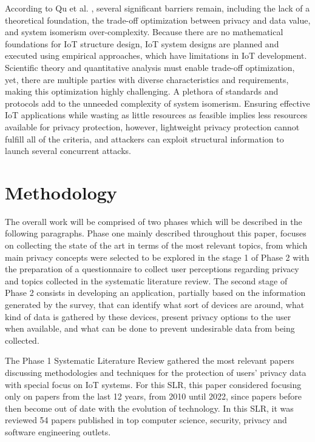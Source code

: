 \documentclass[manuscript,screen,review,natbib=false]{acmart}
\begin{document}
According to Qu et al. \cite{Qu2018Privacy}, several significant barriers
remain, including the lack of a theoretical foundation, the trade-off optimization
between privacy and data value, and system isomerism over-complexity. Because
there are no mathematical foundations for IoT structure design, IoT system
designs are planned and executed using empirical approaches, which have
limitations in IoT development. Scientific theory and quantitative analysis
must enable trade-off optimization, yet, there are multiple parties with
diverse characteristics and requirements, making this optimization highly
challenging. A plethora of standards and protocols add to the unneeded complexity
of system isomerism. Ensuring effective IoT applications while wasting as
little resources as feasible implies less resources available for privacy
protection, however, lightweight privacy protection cannot fulfill all of
the criteria, and attackers can exploit structural information to launch
several concurrent attacks.

\section{Methodology}

The overall work will be comprised of two phases which will be described
in the following paragraphs. Phase one mainly described throughout this
paper, focuses on collecting the state of the art in terms of the most relevant
topics, from which main privacy concepts were selected to be explored in
the stage 1 of Phase 2 with the preparation of a questionnaire to collect
user perceptions regarding privacy and topics collected in the systematic
literature review. The second stage of Phase 2 consists in developing an
application, partially based on the information generated by the survey,
that can identify what sort of devices are around, what kind of data is
gathered by these devices, present privacy options to the user when available,
and what can be done to prevent undesirable data from being collected.
\par
The Phase 1 Systematic Literature Review gathered the most relevant papers
discussing methodologies and techniques for the protection of users' privacy
data with special focus on IoT systems. For this SLR, this paper considered
focusing only on papers from the last 12 years, from 2010 until 2022, since
papers before then become out of date with the evolution of technology.
In this SLR, it was reviewed 54 papers published in top computer science,
security, privacy and software engineering outlets.
\end{document}
